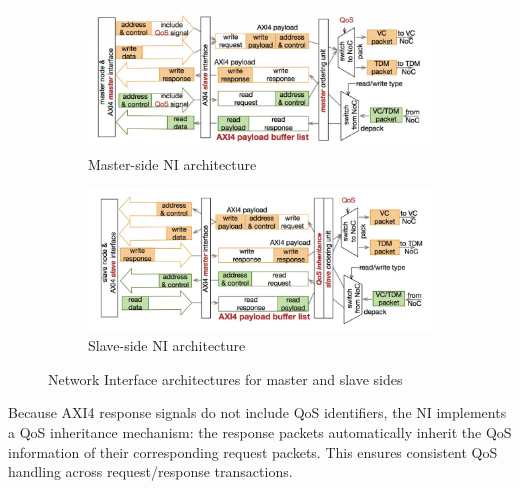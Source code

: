 \begin{figure}[htbp]
    \centering
    \begin{subfigure}[b]{0.48\textwidth}
        \centering
        \includegraphics[width=\textwidth]{img/Master-Side_NI.png}
        \caption{Master-side NI architecture}
        \label{fig:master_NI}
    \end{subfigure}
    \hfill
    \begin{subfigure}[b]{0.48\textwidth}
        \centering
        \includegraphics[width=\textwidth]{img/Slave-Side_NI.png}
        \caption{Slave-side NI architecture}
        \label{fig:slave_NI}
    \end{subfigure}
    \caption{Network Interface architectures for master and slave sides}
    \label{fig:NI_architectures}
\end{figure}



\label{qos_inheritance}
Because AXI4 response signals do not include QoS identifiers, the NI implements a QoS inheritance mechanism: the response packets automatically inherit the QoS information of their corresponding request packets. This ensures consistent QoS handling across request/response transactions.


